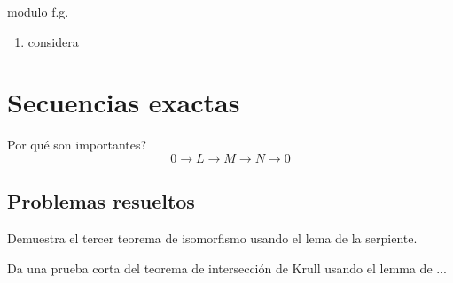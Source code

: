 \documentclass[b5paper,10pt]{book}
\begin{document}
\begin{defi}
modulo f.g.
\end{defi}

\begin{ej}
\begin{enumerate}[label=(i)]
	\item considera
\end{enumerate}
\end{ej}

\section{Secuencias exactas}

Por qué son importantes?
\[
0\to L \to M\to N\to 0
\]

\subsection{Problemas resueltos}

\begin{problema}
Demuestra el tercer teorema de isomorfismo usando el lema de la serpiente.
\end{problema}

\begin{problema}
Da una prueba corta del teorema de intersección de Krull usando el
lemma de ... 
\end{problema}
\end{document}
